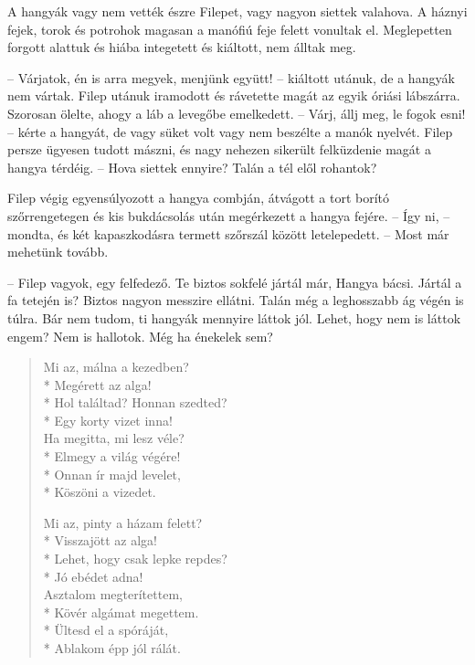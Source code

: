 \documentclass[10pt]{memoir}
\begin{document}
A hangyák vagy nem vették észre Filepet, vagy nagyon siettek valahova. A háznyi
fejek, torok és potrohok magasan a manófiú feje felett vonultak el. Meglepetten
forgott alattuk és hiába integetett és kiáltott, nem álltak meg.

-- Várjatok, én is arra megyek, menjünk együtt! -- kiáltott utánuk, de a
hangyák nem vártak. Filep utánuk iramodott és rávetette magát az egyik óriási
lábszárra. Szorosan ölelte, ahogy a láb a levegőbe emelkedett. -- Várj, állj
meg, le fogok esni! -- kérte a hangyát, de vagy süket volt vagy nem beszélte a
manók nyelvét. Filep persze ügyesen tudott mászni, és nagy nehezen sikerült
felküzdenie magát a hangya térdéig. -- Hova siettek ennyire? Talán a tél elől
rohantok?

Filep végig egyensúlyozott a hangya combján, átvágott a tort borító
szőrrengetegen és kis bukdácsolás után megérkezett a hangya fejére. -- Így ni,
-- mondta, és két kapaszkodásra termett szőrszál között letelepedett. -- Most
már mehetünk tovább.

-- Filep vagyok, egy felfedező. Te biztos sokfelé jártál már, Hangya bácsi.
Jártál a fa tetején is? Biztos nagyon messzire ellátni. Talán még a leghosszabb
ág végén is túlra. Bár nem tudom, ti hangyák mennyire láttok jól. Lehet, hogy
nem is láttok engem? Nem is hallotok. Még ha énekelek sem?

\begin{verse}

Mi az, málna a kezedben? \\*
\vin Megérett az alga! \\*
Hol találtad? Honnan szedted? \\*
\vin Egy korty vizet inna! \\
Ha megitta, mi lesz véle? \\*
\vin Elmegy a világ végére! \\*
Onnan ír majd levelet, \\*
\vin Köszöni a vizedet.

Mi az, pinty a házam felett? \\*
\vin Visszajött az alga! \\*
Lehet, hogy csak lepke repdes? \\*
\vin Jó ebédet adna! \\
Asztalom megterítettem, \\*
\vin Kövér algámat megettem. \\*
Ültesd el a spóráját, \\*
\vin Ablakom épp jól rálát.

\end{verse}
\end{document}

